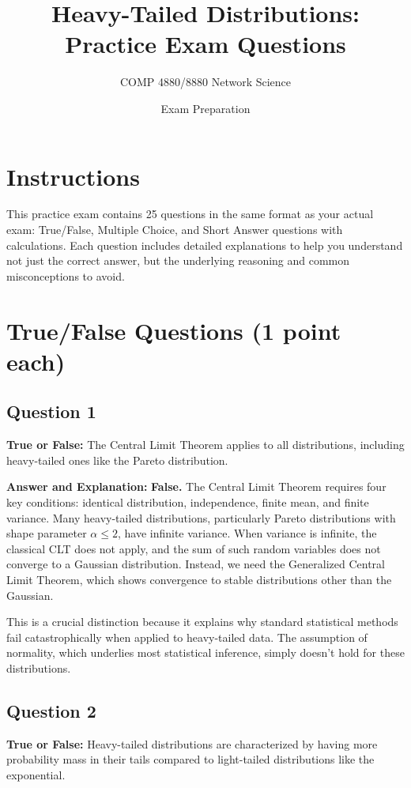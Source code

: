 \documentclass[11pt]{article}
\title{Heavy-Tailed Distributions: Practice Exam Questions}
\author{COMP 4880/8880 Network Science}
\date{Exam Preparation}
\newenvironment{answer}{\color{answercolor}\begin{framed}\textbf{Answer and Explanation:}}{\end{framed}}
\begin{document}
\maketitle

\section*{Instructions}
This practice exam contains 25 questions in the same format as your actual exam: True/False, Multiple Choice, and Short Answer questions with calculations. Each question includes detailed explanations to help you understand not just the correct answer, but the underlying reasoning and common misconceptions to avoid.

\section{True/False Questions (1 point each)}

\subsection{Question 1}
\textbf{True or False:} The Central Limit Theorem applies to all distributions, including heavy-tailed ones like the Pareto distribution.

\begin{answer}
\textbf{False.} The Central Limit Theorem requires four key conditions: identical distribution, independence, finite mean, and finite variance. Many heavy-tailed distributions, particularly Pareto distributions with shape parameter $\alpha \leq 2$, have infinite variance. When variance is infinite, the classical CLT does not apply, and the sum of such random variables does not converge to a Gaussian distribution. Instead, we need the Generalized Central Limit Theorem, which shows convergence to stable distributions other than the Gaussian.

This is a crucial distinction because it explains why standard statistical methods fail catastrophically when applied to heavy-tailed data. The assumption of normality, which underlies most statistical inference, simply doesn't hold for these distributions.
\end{answer}

\subsection{Question 2}
\textbf{True or False:} Heavy-tailed distributions are characterized by having more probability mass in their tails compared to light-tailed distributions like the exponential.
\end{document}
